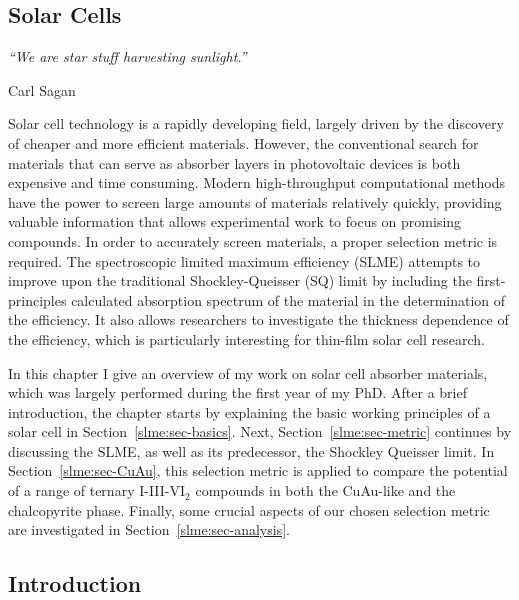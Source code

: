 \begin{refsection} 
 
\chapter{Solar Cells} \label{chapter:slme} 
\pagestyle{chapter}
 
\setlength{\epigraphwidth}{3in} 
\epigraph{\textit{``We are star stuff harvesting sunlight.”}}{Carl Sagan} 
\vspace{3em} 
 
Solar cell technology is a rapidly developing field, largely driven by the 
discovery of cheaper and more efficient materials. However, the conventional 
search for materials that can serve as absorber layers in photovoltaic devices is both expensive and 
time consuming. Modern high-throughput computational methods have the power to 
screen large amounts of materials relatively quickly, providing valuable 
information that allows experimental work to focus on promising compounds. In 
order to accurately screen materials, a proper selection metric is required. 
The spectroscopic limited maximum efficiency (\gls{SLME}) attempts to improve upon 
the traditional Shockley-Queisser (\gls{SQ}) limit by including the first-principles 
calculated absorption spectrum of the material in the determination of the 
efficiency. It also allows researchers to investigate the thickness dependence 
of the efficiency, which is particularly interesting for thin-film solar cell 
research.

In this chapter I give an overview of my work on solar cell absorber materials, 
which was largely performed during the first year of my PhD. After a brief 
introduction, the chapter
starts by explaining the basic working principles of a solar cell 
in Section~\ref{slme:sec-basics}. Next, Section~\ref{slme:sec-metric} 
continues by discussing the \gls{SLME}, as well as its predecessor, the Shockley 
Queisser limit. In Section~\ref{slme:sec-CuAu}, this selection metric is 
applied to compare the potential of a range of ternary I-III-VI$_2$ compounds 
in both the CuAu-like and the chalcopyrite phase. Finally, some crucial 
aspects of our chosen selection metric are investigated in 
Section~\ref{slme:sec-analysis}. 
 
\pagebreak 

\section{Introduction} 
 

\end{refsection}
